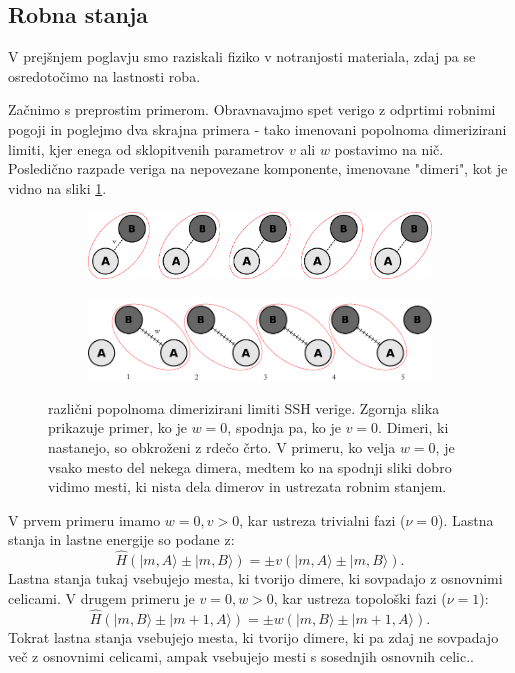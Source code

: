 \subsection{Robna stanja} \label{spomnimoRobna}
V prejšnjem poglavju smo raziskali fiziko v notranjosti materiala, zdaj pa se osredotočimo na lastnosti roba. 

Začnimo s preprostim primerom. Obravnavajmo spet verigo z odprtimi robnimi pogoji in poglejmo dva skrajna primera - tako imenovani popolnoma dimerizirani limiti, kjer enega od sklopitvenih parametrov $v$ ali $w$ postavimo na nič. Posledično razpade veriga na nepovezane komponente, imenovane "dimeri", kot je vidno na sliki \ref{fig:dimerized}.

\begin{figure}[!h]
\centering
\begin{subfigure}{.9\textwidth}
\includegraphics[width=\linewidth]{Figures/MyDimerized1.pdf}
\end{subfigure}
\begin{subfigure}{.9\textwidth}
\includegraphics[width=\linewidth]{Figures/MyDimerized2.pdf}
\end{subfigure}
\caption{različni popolnoma dimerizirani limiti SSH verige. Zgornja slika prikazuje primer, ko je $w=0$, spodnja pa, ko je $v=0$. Dimeri, ki nastanejo, so obkroženi z rdečo črto. V primeru, ko velja $w=0$, je vsako mesto del nekega dimera, medtem ko na spodnji sliki dobro vidimo mesti, ki nista dela dimerov in ustrezata robnim stanjem.}
\label{fig:dimerized}
\end{figure}

V prvem primeru imamo $w=0, v > 0$, kar ustreza trivialni fazi ($\nu=0$). Lastna stanja in lastne energije so podane z:
\begin{equation}
\hat{H} ( |m, A \rangle \pm | m , B \rangle) = \pm v( |m, A \rangle \pm | m, B \rangle ).
\end{equation}
Lastna stanja tukaj vsebujejo mesta, ki tvorijo dimere, ki sovpadajo z osnovnimi celicami.
V drugem primeru je $v=0, w>0$, kar ustreza topološki fazi ($\nu = 1$):
\begin{equation}
\hat{H} ( |m, B \rangle \pm | m + 1 , A \rangle) = \pm w( |m, B \rangle \pm | m+1,A \rangle ).
\end{equation}
Tokrat lastna stanja vsebujejo mesta, ki tvorijo dimere, ki pa zdaj ne sovpadajo več z osnovnimi celicami, ampak vsebujejo mesti s sosednjih osnovnih celic..

